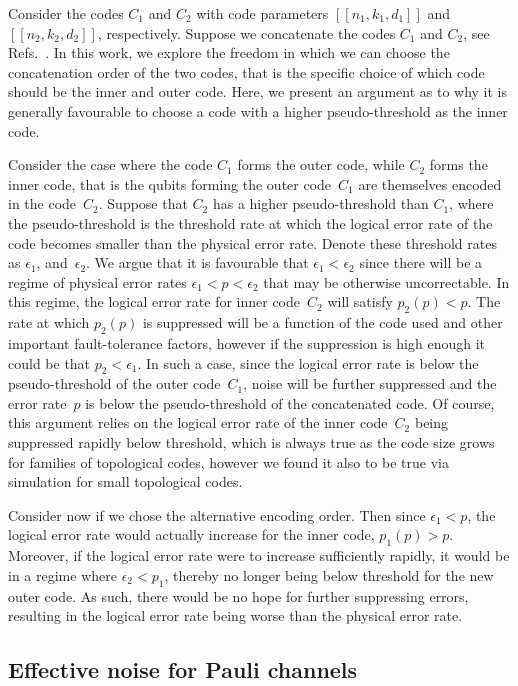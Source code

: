 \documentclass[pra,longbibliography,twocolumn,showpacs,nofootinbib,superscriptaddress,notitlepage]{revtex4-1}
\newcommand{\e}{\epsilon}
\newcommand{\codepar}[1]{\ensuremath{[\![#1]\!]}}
\begin{document}
Consider the codes $C_{1}$ and $C_2$ with code parameters $\codepar{n_{1},k_{1},d_{1}}$ and $\codepar{n_{2},k_{2},d_{2}}$, respectively. Suppose we concatenate the codes $C_{1}$ and $C_{2}$, see Refs.~\cite{JL14, CJL16}. In this work, we explore the freedom in which we can choose the concatenation order of the two codes, that is the specific choice of which code should be the inner and outer code. Here, we present an argument as to why it is generally favourable to choose a code with a higher pseudo-threshold as the inner code.

Consider the case where the code $C_1$ forms the outer code, while $C_2$ forms the inner code, that is the qubits forming the outer code~$C_1$ are themselves encoded in the code~$C_2$. Suppose that $C_2$ has a higher pseudo-threshold than $C_1$, where the pseudo-threshold is the threshold rate at which the logical error rate of the code becomes smaller than the physical error rate. Denote these threshold rates as $\e_1$, and~$\e_2$. We argue that it is favourable that $\e_1 < \e_2$ since there will be a regime of physical error rates $\e_1 < p < \e_2$ that may be otherwise uncorrectable. In this regime, the logical error rate for inner code~$C_2$ will satisfy $p_2(p) < p$. The rate at which $p_2(p)$ is suppressed will be a function of the code used and other important fault-tolerance factors, however if the suppression is high enough it could be that $p_2 < \e_1$. In such a case, since the logical error rate is below the pseudo-threshold of the outer code~$C_1$, noise will be further suppressed and the error rate~$p$ is below the pseudo-threshold of the concatenated code. Of course, this argument relies on the logical error rate of the inner code~$C_2$ being suppressed rapidly below threshold, which is always true as the code size grows for families of topological codes, however we found it also to be true via simulation for small topological codes.

Consider now if we chose the alternative encoding order. Then since $\e_1<p$, the logical error rate would actually increase for the inner code, $p_1 (p) > p$. Moreover, if the logical error rate were to increase sufficiently rapidly, it would be in a regime where $\e_2 < p_1$, thereby no longer being below threshold for the new outer code. As such, there would be no hope for further suppressing errors, resulting in the logical error rate being worse than the physical error rate.


\subsection{Effective noise for Pauli channels}
\label{subsec:PauliChanG}
\end{document}
